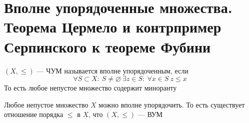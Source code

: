 \newpage
\section{Вполне упорядоченные множества. Теорема Цермело и контрпример Серпинского к теореме Фубини}

\begin{definition}
	$(X, \leq)$ --- ЧУМ называется вполне упорядоченным, если 
	$$
	\forall S \subset X: \ S \neq \varnothing \ \exists z \in S: \ \forall x \in S \ z \leq x
	$$
	То есть любое непустое множество содержит миноранту
\end{definition}
\begin{theorem}[Цермело]
	Любое непустое множество $X$ можно вполне упорядочить. То есть существует отношение порядка $\leq$ в $X$, что $(X, \leq)$ --- ВУМ
\end{theorem}
